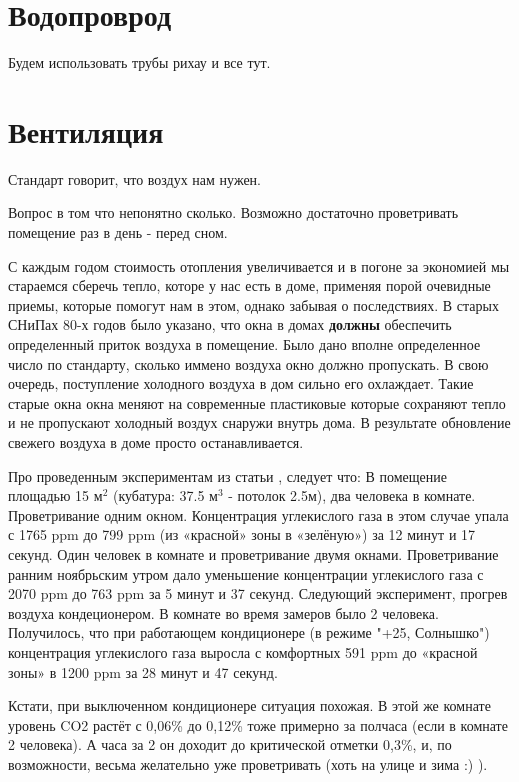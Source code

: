 \documentclass[10pt, twocolumn]{report}
\begin{document}
\chapter{Водопроврод}
Будем использовать трубы рихау и все тут.

\chapter{Вентиляция}
Стандарт говорит, что воздух нам нужен.

Вопрос в том что непонятно сколько. Возможно достаточно проветривать помещение раз в день - перед сном.

С каждым годом стоимость отопления увеличивается и в погоне за экономией мы стараемся сберечь тепло, которе у нас есть в доме, применяя порой очевидные приемы, которые помогут нам в этом, однако забывая о последствиях. В старых СНиПах 80-х годов было указано, что окна в домах \textbf{должны} обеспечить определенный приток воздуха в помещение. Было дано вполне определенное число по стандарту, сколько иммено воздуха окно должно пропускать. В свою очередь, поступление холодного воздуха в дом сильно его охлаждает. Такие старые окна окна меняют на современные пластиковые которые сохраняют тепло и не пропускают холодный воздух снаружи внутрь дома. В результате обновление свежего воздуха в доме просто останавливается. 

Про проведенным экспериментам из статьи \cite{co2}, следует что:
В помещение площадью 15 $\text{м}^{2}$ (кубатура: 37.5 $\text{м}^3$ - потолок 2.5м), два человека в комнате. 
Проветривание одним окном. Концентрация углекислого газа в этом случае упала с 1765 ppm до 799 ppm (из «красной» зоны в «зелёную») за 12 минут и 17 секунд.
Один человек в комнате и проветривание двумя окнами. 
Проветривание ранним ноябрьским утром дало уменьшение концентрации углекислого газа с 2070 ppm до 763 ppm за 5 минут и 37 секунд.
Следующий эксперимент, прогрев воздуха кондеционером.
В комнате во время замеров было 2 человека. Получилось, что при работающем кондиционере (в режиме "+25, Солнышко") концентрация углекислого газа выросла с комфортных 591 ppm до «красной зоны» в 1200 ppm за 28 минут и 47 секунд.

Кстати, при выключенном кондиционере ситуация похожая. В этой же комнате уровень CO2 растёт с 0,06\% до 0,12\% тоже примерно за полчаса (если в комнате 2 человека). А часа за 2 он доходит до критической отметки 0,3\%, и, по возможности, весьма желательно уже проветривать (хоть на улице и зима :) ).
\end{document}
